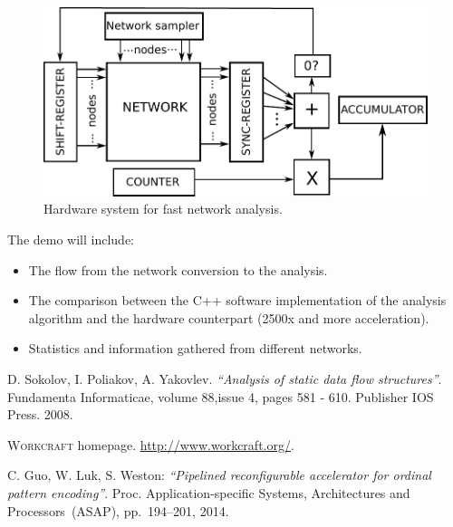 \documentclass[conference]{IEEEtran}
\begin{document}
\begin{figure}[ht!]
\vspace{-3mm}
\begin{center}
	\includegraphics[width=\linewidth]{FIG/fantasi+.pdf}
	\caption{Hardware system for fast network analysis.}
	\label{fig:fantasi}
\end{center}
\vspace{-5mm}
\end{figure}
\noindent
The demo will include:
\begin{itemize}
\item The flow from the network conversion to the analysis.
\item The comparison between the C++ software implementation of the analysis algorithm and the hardware counterpart (2500x and more acceleration).
\item Statistics and information gathered from different networks.
\end{itemize}

\begin{thebibliography}{3}

	D. Sokolov, I. Poliakov, A. Yakovlev. \emph{``Analysis of static data flow structures''}.
	Fundamenta Informaticae, volume 88,issue 4, pages 581 - 610. Publisher IOS Press. 2008.

	\textsc{Workcraft} homepage. \url{http://www.workcraft.org/}.	

	C. Guo, W. Luk, S. Weston:
	\emph{``Pipelined reconfigurable accelerator for ordinal pattern encoding''}.
	Proc. Application-specific Systems, Architectures and Processors~(ASAP),
	pp.~194--201, 2014.

\end{thebibliography}




\end{document}
